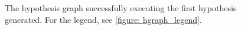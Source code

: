 \begin{figure}[H]
     \caption{The hypothesis graph successfully executing the first hypothesis generated. For the legend, see \cref{figure: hgraph_legend}.}
     \label{figure: example_hgraph}
\end{figure}


